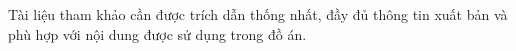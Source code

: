 \documentclass[../main.tex]{subfiles}
\begin{document}
Tài liệu tham khảo cần được trích dẫn thống nhất, đầy đủ thông tin xuất bản và phù hợp với nội dung được sử dụng trong đồ án.
\end{document}
